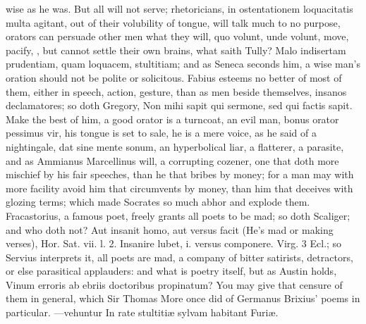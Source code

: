 {wise as he was. But all will not serve; rhetoricians, in ostentationem
loquacitatis multa agitant, out of their volubility of tongue, will
talk much to no purpose, orators can persuade other men what they will,
quo volunt, unde volunt, move, pacify, \etc{}, but cannot settle their own
brains, what saith Tully? Malo indisertam prudentiam, quam loquacem,
stultitiam; and as Seneca seconds him, a wise man's oration should
not be polite or solicitous. Fabius esteems no better of most of
them, either in speech, action, gesture, than as men beside themselves,
insanos declamatores; so doth Gregory, Non mihi sapit qui sermone, sed
qui factis sapit. Make the best of him, a good orator is a turncoat, an
evil man, bonus orator pessimus vir, his tongue is set to sale, he is a
mere voice, as he said of a nightingale, dat sine mente sonum, an
hyperbolical liar, a flatterer, a parasite, and as  Ammianus
Marcellinus will, a corrupting cozener, one that doth more mischief by
his fair speeches, than he that bribes by money; for a man may with
more facility avoid him that circumvents by money, than him that
deceives with glozing terms; which made Socrates so much abhor and
explode them. Fracastorius, a famous poet, freely grants all poets
to be mad; so doth Scaliger; and who doth not? Aut insanit homo,
aut versus facit (He's mad or making verses), Hor. Sat. vii. l. 2.
Insanire lubet, i. versus componere. Virg. 3 Ecl.; so Servius
interprets it, all poets are mad, a company of bitter satirists,
detractors, or else parasitical applauders: and what is poetry itself,
but as Austin holds, Vinum erroris ab ebriis doctoribus propinatum? You
may give that censure of them in general, which Sir Thomas More once
did of Germanus Brixius' poems in particular.
---vehuntur
In rate stultiti\ae{} sylvam habitant Furi\ae{}.

}
